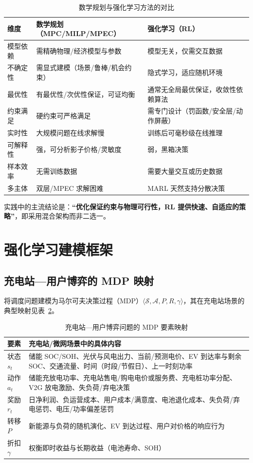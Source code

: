 \documentclass[UTF8,a4paper,11pt]{ctexart}
\begin{document}
\begin{table}[htbp]
\centering
\small
\caption{数学规划与强化学习方法的对比}
\label{tab:compare}
\begin{tabular}{p{2.9cm} p{6.0cm} p{6.0cm}}
\toprule
\textbf{维度} & \textbf{数学规划（MPC/MILP/MPEC）} & \textbf{强化学习（RL）}\\
\midrule
模型依赖 & 需精确物理/经济模型与参数 & 模型无关，仅需交互数据\\
不确定性 & 需显式建模（场景/鲁棒/机会约束） & 隐式学习，适应随机环境\\
最优性 & 有最优性/次优性保证，可证均衡 & 通常无全局最优保证，收敛性依赖算法\\
约束满足 & 硬约束可严格满足 & 需专门设计（罚函数/安全层/动作屏蔽）\\
实时性 & 大规模问题在线求解慢 & 训练后可毫秒级在线推理\\
可解释性 & 强，可分析影子价格/灵敏度 & 弱，黑箱决策\\
样本效率 & 无需训练数据 & 需要大量交互或历史数据\\
多主体 & 双层/MPEC 求解困难 & MARL 天然支持分散决策\\
\bottomrule
\end{tabular}
\end{table}

实践中的主流结论是：\textbf{“优化保证约束与物理可行性，RL 提供快速、自适应的策略”}，即采用混合架构而非二选一\cite{ref7,ref8}。

\section{强化学习建模框架}

\subsection{充电站—用户博弈的 MDP 映射}
将调度问题建模为马尔可夫决策过程（MDP）$\langle \mathcal{S},\mathcal{A},P,R,\gamma \rangle$，其在充电站场景的典型映射见表~\ref{tab:mdp}。

\begin{table}[htbp]
\centering
\small
\caption{充电站—用户博弈问题的 MDP 要素映射}
\label{tab:mdp}
\begin{tabular}{p{2.6cm} p{11.8cm}}
\toprule
\textbf{要素} & \textbf{充电站/微网场景中的具体内容}\\
\midrule
状态 $s_t$ & 储能 SOC/SOH、光伏与风电出力、当前/预测电价、EV 到达率与剩余 SOC、交通流量、时间（时段/节假日）、上一时刻功率\\
动作 $a_t$ & 储能充放电功率、充电站售电/购电电价或服务费、充电桩功率分配、V2G 放电激励、失负荷/弃电决策\\
奖励 $r_t$ & 日净利润、负运营成本、用户成本/满意度、电池退化成本、失负荷/弃电惩罚、电压/功率偏差惩罚\\
转移 $P$ & 新能源与负荷的随机演化、EV 到达过程、用户对价格的响应行为\\
折扣 $\gamma$ & 权衡即时收益与长期收益（电池寿命、SOH）\\
\bottomrule
\end{tabular}
\end{table}
\end{document}
